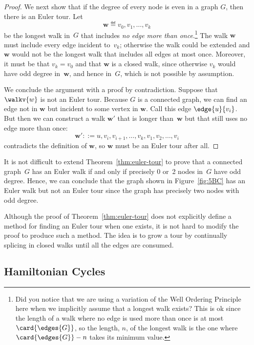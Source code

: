 \begin{editingnotes}
\begin{proof}
We next show that if the degree of every node is even in a graph
$G$, then there is an Euler tour.  Let
\[
\mathbf{w} \eqdef v_0, v_1, \dots, v_k
\]
be the longest walk in~$G$ that includes \emph{no edge more than
  once}.\footnote{Did you notice that we are using a variation of the
  Well Ordering Principle here when we implicitly assume that a
  longest walk exists?  This is ok since the length of a walk where no
  edge is used more than once is at most~$\card{\edges{G}}$, so the
  length, $n$, of the longest walk is the one where $\card{\edges{G}}
  - n$ takes its minimum value.}  The walk $\mathbf{w}$ must include
every edge incident to~$v_k$; otherwise the walk could be extended and
$\mathbf{w}$ would not be the longest walk that includes all edges at
most once.  Moreover, it must be that $v_k = v_0$ and that
$\mathbf{w}$ is a closed walk, since otherwise $v_k$ would have odd
degree in~$\mathbf{w}$, and hence in~$G$, which is not possible by
assumption.

We conclude the argument with a proof by contradiction.  Suppose that
$\walkv{w}$ is not an Euler tour.  Because $G$ is a connected graph,
we can find an edge not in $\mathbf{w}$ but incident to some vertex in
$\mathbf{w}$.  Call this edge $\edge{u}{v_i}$.  But then we can
construct a walk $\mathbf{w}'$ that is longer than~$\mathbf{w}$ but
that still uses no edge more than once:
\[
   \mathbf{w}' ::= u, v_i, v_{i + 1}, \dots, v_k, v_1, v_2, \dots, v_i
\]
contradicts the definition of $\mathbf{w}$, so $\mathbf{w}$ must be an
Euler tour after all.
\end{proof}

It is not difficult to extend Theorem~\ref{thm:euler-tour} to prove that a
connected graph~$G$ has an Euler walk if and only if precisely 0 or~2
nodes in~$G$ have odd degree.  Hence, we can conclude that the graph
shown in Figure~\ref{fig:5BC} has an Euler walk but not an Euler tour
since the graph has precisely two nodes with odd degree.

Although the proof of Theorem~\ref{thm:euler-tour} does not explicitly
define a method for finding an Euler tour when one exists, it is not
hard to modify the proof to produce such a method.  The idea is to
grow a tour by continually splicing in closed walks until all the
edges are consumed.

\subsection{Hamiltonian Cycles}


\end{editingnotes}
